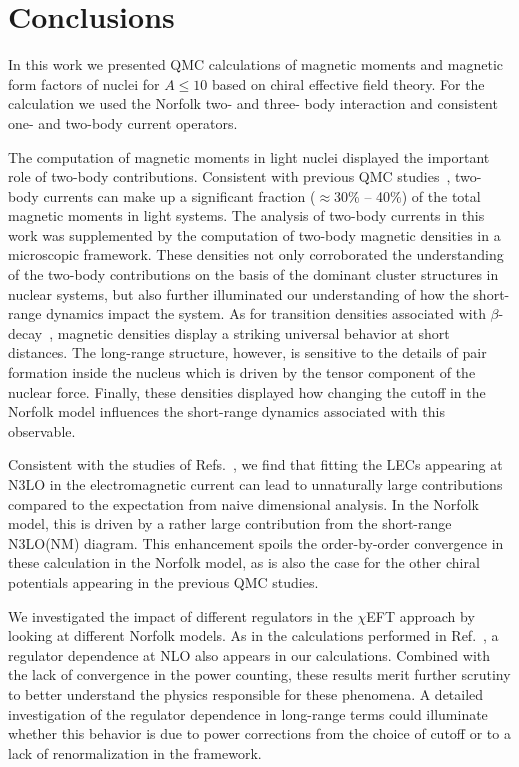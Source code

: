 \documentclass[aps,prc,floatfix,showpacs,twocolumn, preprintnumbers]{revtex4-2}
\begin{document}
    
\section{Conclusions}
\label{sec:conclusion}
In this work we presented QMC calculations of magnetic moments and magnetic form factors of nuclei
for $A\leq10$ based on chiral effective field theory. For the calculation we used the Norfolk two- and three- body interaction and consistent
one- and two-body current operators.

The computation of magnetic moments in light nuclei displayed the important role of two-body contributions. Consistent with previous QMC studies~\cite{Pastore:2012rp,Martin:2023dhl}, two-body currents can make up a significant fraction (${\approx}$30\% -- 40\%) of the total magnetic moments in light systems. The analysis of two-body currents in this work was supplemented by the computation of two-body magnetic densities in a microscopic framework. These densities not only corroborated the understanding of the two-body contributions on the basis of the dominant cluster structures in nuclear systems, but also further illuminated our understanding of how the short-range dynamics impact the system. As for transition densities associated with $\beta$-decay~\cite{King:2020wmp}, magnetic densities display a striking universal behavior at short distances. The long-range structure, however, is sensitive to the details of pair formation inside the nucleus which is driven by the tensor component of the nuclear force. Finally, these densities displayed how changing the cutoff in the Norfolk model influences the short-range dynamics associated with this observable. 

Consistent with the studies of Refs.~\cite{Gnech:2022vwr,Martin:2023dhl}, we find that fitting the LECs appearing at N3LO in the electromagnetic current can lead to unnaturally large contributions compared to the expectation from naive dimensional analysis. In the Norfolk model, this is driven by a rather large contribution from the short-range N3LO(NM) diagram. This enhancement spoils the order-by-order convergence in these calculation in the Norfolk model, as is also the case for the other chiral potentials appearing in the previous QMC studies. 

We investigated the impact of different regulators in the $\chi$EFT approach by looking at different Norfolk models. As in the calculations performed in Ref.~\cite{Pal:2023gll}, a regulator dependence at NLO also appears in our calculations. Combined with the lack of convergence in the power counting, these results merit further scrutiny to better understand the physics responsible for these phenomena. A detailed investigation of the regulator dependence in long-range terms could illuminate whether this behavior is due to power corrections from the choice of cutoff or to a lack of renormalization in the framework. 
\end{document}

